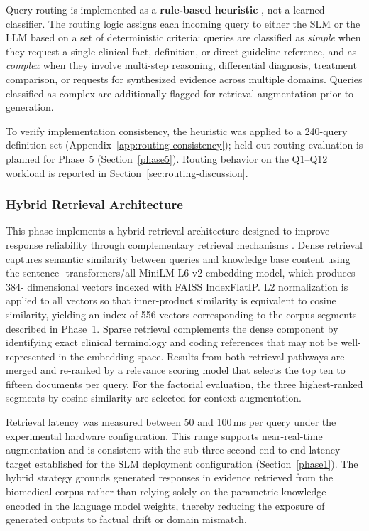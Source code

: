 Query routing is implemented as a \textbf{rule-based heuristic} , not a learned classifier. The routing logic assigns each 
incoming query to either the SLM or the LLM based on a set of deterministic 
criteria: queries are classified as \emph{simple} when they request a single 
clinical fact, definition, or direct guideline reference, and as \emph{
complex} when they involve multi-step reasoning, differential diagnosis, 
treatment comparison, or requests for synthesized evidence across multiple 
domains. Queries classified as complex are additionally flagged for retrieval 
augmentation prior to generation.

To verify implementation consistency, the heuristic was applied to a 240-query definition set (Appendix~\ref{app:routing-consistency}); held-out routing evaluation is planned for Phase~5 (Section~\ref{phase5}). Routing behavior on the Q1--Q12 workload is reported in Section~\ref{sec:routing-discussion}.

\subsubsection{Hybrid Retrieval Architecture}

This phase implements a hybrid retrieval architecture designed to improve 
response reliability through complementary retrieval mechanisms \cite{
yang2025rag, xu2025mega}. Dense retrieval captures semantic similarity 
between queries and knowledge base content using the sentence-
transformers/all-MiniLM-L6-v2 embedding model, which produces 384-
dimensional vectors indexed with FAISS IndexFlatIP. L2 normalization is 
applied to all vectors so that inner-product similarity is equivalent to 
cosine similarity, yielding an index of 556 vectors corresponding to the 
corpus segments described in Phase~1. Sparse retrieval complements the dense 
component by identifying exact clinical terminology and coding references that 
may not be well-represented in the embedding space. Results from both 
retrieval pathways are merged and re-ranked by a relevance scoring model that 
selects the top ten to fifteen documents per query. For the factorial 
evaluation, the three highest-ranked segments by cosine similarity are 
selected for context augmentation.

Retrieval latency was measured between 50 and 100\,ms per query under the 
experimental hardware configuration. This range supports near-real-time 
augmentation and is consistent with the sub-three-second end-to-end latency 
target established for the SLM deployment configuration (Section~\ref{phase1}). The hybrid strategy grounds generated responses in evidence 
retrieved from the biomedical corpus rather than relying solely on the 
parametric knowledge encoded in the language model weights, thereby reducing 
the exposure of generated outputs to factual drift or domain mismatch.

